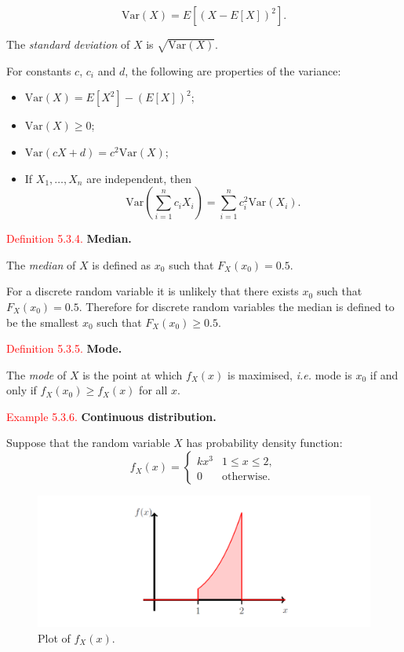 \documentclass[
]{book}
\begin{document}
\[ \text{Var} (X) = E \left[ (X-E[X])^2 \right].\]

The \emph{standard deviation} of \(X\) is \(\sqrt{\text{Var} (X)}\).

For constants \(c\), \(c_i\) and \(d\), the following are properties of the variance:

\begin{itemize}
\item
  \(\text{Var}(X) = E[X^2] - (E[X])^2\);
\item
  \(\text{Var}(X) \geq 0\);
\item
  \(\text{Var}(cX + d) = c^2 \text{Var}(X)\);
\item
  If \(X_1,\dots,X_n\) are independent, then\\

  \[\text{Var} \left( \sum_{i=1}^n c_i X_i \right) = \sum_{i=1}^n c_i^2 \text{Var} (X_i).\]
\end{itemize}

\leavevmode{}%
\textcolor{red}{Definition 5.3.4.}
{\textbf{Median.}}

The \emph{median} of \(X\) is defined as \(x_{0}\) such that \(F_X (x_{0}) =0.5\).

For a discrete random variable it is unlikely that there exists \(x_0\) such that \(F_X (x_{0}) =0.5\). Therefore for discrete random variables the median is defined to be the smallest \(x_0\) such that \(F_X (x_0) \geq 0.5\).

\leavevmode{}%
\textcolor{red}{Definition 5.3.5.}
{\textbf{Mode.}}

The \emph{mode} of \(X\) is the point at which \(f_X (x)\) is maximised, \emph{i.e.} mode is \(x_{0}\) if and only if \(f_X(x_{0}) \geq f_X(x)\) for all \(x\).

\leavevmode{}%
\textcolor{red}{Example 5.3.6.}
{\textbf{Continuous distribution.}}

Suppose that the random variable \(X\) has probability density function:\\

\[ f_X (x) = \left\{ \begin{array}{ll} k x^3 & 1 \leq x \leq 2, \\
0 & \mbox{otherwise}. \end{array} \right. \]

\begin{figure}
\includegraphics[width=1\linewidth]{Images/density_ex} \caption{Plot of $f_X (x)$.}\label{fig:density1}
\end{figure}
\end{document}
